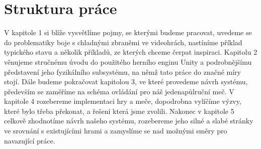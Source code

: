 \section*{Struktura práce}

V kapitole 1 si blíže vysvětlíme pojmy, se kterými budeme pracovat, uvedeme se do problematiky boje s chladnými zbraněmi ve videohrách, nastíníme příklad typického stavu a několik příkladů, ze kterých chceme čerpat inspiraci. Kapitolu 2 věnujeme stručnému úvodu do použitého herního enginu Unity a podrobnějšímu představení jeho fyzikálního subsystému, na němž tato práce do značné míry stojí. Dále budeme pokračovat kapitolou 3, ve které provedeme návrh systému, především se zaměříme na schéma ovládání pro náš jedenapůlruční meč. V kapitole 4 rozebereme implementaci hry a meče, dopodrobna vylíčíme výzvy, které bylo třeba překonat, a řešení která jsme zvolili. Nakonec v kapitole 5 celkově zhodnotíme návrh našeho systému, rozebereme jeho silné a slabé stránky ve srovnání s existujícími hrami a zamyslíme se nad možnými směry pro navazující práce.
